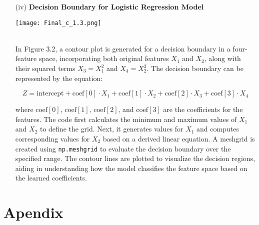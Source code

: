 \documentclass{article}
\begin{document}
\begin{enumerate}
    \item[(iv)] 
    \textbf{Decision Boundary for Logistic Regression Model} \\
    \begin{center}
        \centering
        \texttt{[image: Final\_c\_1.3.png]} \\
        \centering
    \end{center}
    \\
    In Figure 3.2, a contour plot is generated for a decision boundary in a four-feature space, incorporating both original features \(X_1\) and \(X_2\), along with their squared terms \(X_3 = X_1^2\) and \(X_4 = X_2^2\). The decision boundary can be represented by the equation:

\[
Z = \text{intercept} + \text{coef}[0] \cdot X_1 + \text{coef}[1] \cdot X_2 + \text{coef}[2] \cdot X_3 + \text{coef}[3] \cdot X_4
\]

where \(\text{coef}[0]\), \(\text{coef}[1]\), \(\text{coef}[2]\), and \(\text{coef}[3]\) are the coefficients for the features. The code first calculates the minimum and maximum values of \(X_1\) and \(X_2\) to define the grid. Next, it generates values for \(X_1\) and computes corresponding values for \(X_2\) based on a derived linear equation. A meshgrid is created using \texttt{np.meshgrid} to evaluate the decision boundary over the specified range. The contour lines are plotted to visualize the decision regions, aiding in understanding how the model classifies the feature space based on the learned coefficients.
\end{enumerate}

\newpage
\section*{Apendix}
\end{document}
